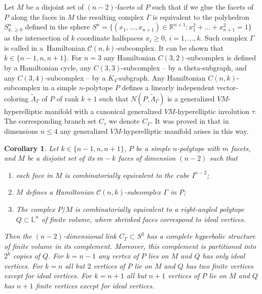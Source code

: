 \documentclass[12pt]{amsart}
\newtheorem{corollary}[formula]{Corollary}
\theoremstyle{definition}
\theoremstyle{remark}
\begin{document}
Let $M$ be a disjoint set of $(n-2)$-facets of $P$ such that if we glue the facets of $P$ along the faces in $M$ the resulting complex $\Gamma$ is equivalent to the polyhedron $S^n_{k,\geqslant 0}$ defined in the sphere 
$S^n=\{(x_1,\dots, x_{n+1})\in\mathbb R^{n+1}\colon x_1^2+\dots+x_{n+1}^2=1\}$ as the intersection 
of $k$ coordinate halfspaces $x_i\geqslant 0$, $i=1,\dots,k$. 
Such complex $\Gamma$ is called in \cite{E26} a~Hamiltonian $\mathcal{C}(n,k)$-subcomplex. 
It can be shown that $k\in\{n-1,n,n+1\}$. For $n=3$ any Hamiltonian
$C(3,2)$-subcomplex is defined by a Hamiltonian cycle, any $C(3,3)$-subcomplex -- by a
theta-subgraph, and any 
$C(3,4)$-subcomplex -- by a $K_4$-subgraph. Any Hamiltonian $C(n,k)$-subcomplex
in a simple $n$-polytope $P$ defines a linearly independent vector-coloring $\widetilde{\Lambda}_{\Gamma}$
of $P$ of rank $k+1$ such that $N(P,\widetilde{\Lambda}_{\Gamma})$ is a generalized $VM$-hyperelliptic manifold
with a canonical generalized $VM$-hyperelliptic involution $\tau$. 
The corresponding branch set $C_\tau$ we denote $C_\Gamma$. It was proved in \cite[Corollary 4.1]{E26} that in dimensions 
$n\leqslant 4$ any generalized $VM$-hyperelliptic manifold arises in this way.

\begin{corollary}\label{corcnk}
Let $k\in\{n-1,n,n+1\}$, $P$ be a simple $n$-polytope with $m$ facets,
and $M$ be a disjoint set of its  $m-k$ faces of dimension $(n-2)$ such that 
\begin{enumerate}
\item each face in $M$ is combinatorially equivalent to the cube $I^{n-2}$;
\item $M$ defines a Hamiltonian $\mathcal{C}(n,k)$-subcomplex $\Gamma$ in $P$;
\item The complex $P/M$  is combinatorially equivalent to a right-angled polytope $Q\subset\mathbb L^n$ of finite volume, where shrinked faces correspond to ideal vertices.
\end{enumerate}
Then the $(n-2)$-dimensional link $C_\Gamma\subset S^3$ has a complete hyperbolic structure of finite volume in its complement.
Moreover, this complement is partitioned into $2^k$ copies of $Q$. For $k=n-1$ any vertex of $P$ lies on $M$ and $Q$ has only ideal vertices. For $k=n$ all but $2$ vertices of $P$ lie on $M$ and $Q$ has two finite vertices except for ideal vertices. 
For $k=n+1$ all but $n+1$ vertices of $P$ lie on $M$ and $Q$ has $n+1$ finite vertices except for ideal vertices.
\end{corollary}
\end{document}
